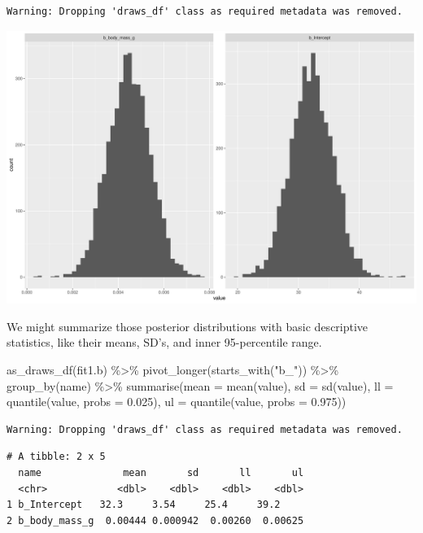 \documentclass[
  letterpaper,
  DIV=11,
  numbers=noendperiod]{scrartcl}
\newenvironment{Shaded}{\begin{snugshade}}{\end{snugshade}}
\newcommand{\AttributeTok}[1]{\textcolor[rgb]{0.40,0.45,0.13}{#1}}
\newcommand{\FloatTok}[1]{\textcolor[rgb]{0.68,0.00,0.00}{#1}}
\newcommand{\FunctionTok}[1]{\textcolor[rgb]{0.28,0.35,0.67}{#1}}
\newcommand{\NormalTok}[1]{\textcolor[rgb]{0.00,0.23,0.31}{#1}}
\newcommand{\SpecialCharTok}[1]{\textcolor[rgb]{0.37,0.37,0.37}{#1}}
\newcommand{\StringTok}[1]{\textcolor[rgb]{0.13,0.47,0.30}{#1}}
\begin{document}
\begin{verbatim}
Warning: Dropping 'draws_df' class as required metadata was removed.
\end{verbatim}

\includegraphics{Bayes_Lab_1_files/figure-pdf/unnamed-chunk-34-1.pdf}

We might summarize those posterior distributions with basic descriptive
statistics, like their means, SD's, and inner 95-percentile range.

\begin{Shaded}
\begin{Highlighting}[]
\FunctionTok{as\_draws\_df}\NormalTok{(fit1.b) }\SpecialCharTok{\%\textgreater{}\%} 
  \FunctionTok{pivot\_longer}\NormalTok{(}\FunctionTok{starts\_with}\NormalTok{(}\StringTok{"b\_"}\NormalTok{)) }\SpecialCharTok{\%\textgreater{}\%} 
  \FunctionTok{group\_by}\NormalTok{(name) }\SpecialCharTok{\%\textgreater{}\%} 
  \FunctionTok{summarise}\NormalTok{(}\AttributeTok{mean =} \FunctionTok{mean}\NormalTok{(value),}
            \AttributeTok{sd =} \FunctionTok{sd}\NormalTok{(value),}
            \AttributeTok{ll =} \FunctionTok{quantile}\NormalTok{(value, }\AttributeTok{probs =} \FloatTok{0.025}\NormalTok{),}
            \AttributeTok{ul =} \FunctionTok{quantile}\NormalTok{(value, }\AttributeTok{probs =} \FloatTok{0.975}\NormalTok{))}
\end{Highlighting}
\end{Shaded}

\begin{verbatim}
Warning: Dropping 'draws_df' class as required metadata was removed.
\end{verbatim}

\begin{verbatim}
# A tibble: 2 x 5
  name              mean       sd       ll       ul
  <chr>            <dbl>    <dbl>    <dbl>    <dbl>
1 b_Intercept   32.3     3.54     25.4     39.2    
2 b_body_mass_g  0.00444 0.000942  0.00260  0.00625
\end{verbatim}
\end{document}

